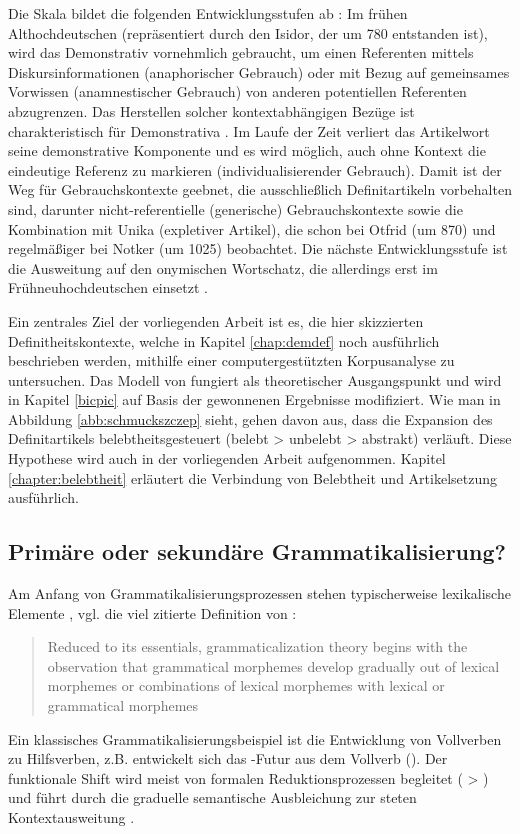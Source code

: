  
Die Skala bildet die folgenden Entwicklungsstufen ab \parencite[vgl. auch][69-78]{Szczepaniak2011a}: Im frühen Althochdeutschen (repräsentiert durch den Isidor, der um 780 entstanden ist), wird das Demonstrativ vornehmlich gebraucht, um einen Referenten mittels Diskursinformationen (anaphorischer Gebrauch) oder mit Bezug auf gemeinsames Vorwissen (anamnestischer Gebrauch) von anderen potentiellen Referenten abzugrenzen. Das Herstellen solcher kontextabhängigen Bezüge ist charakteristisch für Demonstrativa \parencite{Himmelmann1997}. Im Laufe der Zeit verliert das Artikelwort  seine demonstrative Komponente und es wird möglich, auch ohne Kontext die eindeutige Referenz zu markieren (individualisierender Gebrauch). Damit ist der Weg für Gebrauchskontexte geebnet, die ausschließlich Definitartikeln vorbehalten sind, darunter nicht-referentielle (generische) Gebrauchskontexte sowie die Kombination mit Unika (expletiver Artikel), die \parencite{Oubouzar1989,Oubouzar1992} schon bei Otfrid (um 870) und regelmäßiger bei Notker (um 1025) beobachtet. Die nächste Entwicklungsstufe ist die Ausweitung auf den onymischen Wortschatz, die allerdings erst im Frühneuhochdeutschen einsetzt \parencite{Schmuck2014}. 

Ein zentrales Ziel der vorliegenden Arbeit ist es, die hier skizzierten Definitheitskontexte, welche in Kapitel \ref{chap:demdef} noch ausführlich beschrieben werden, mithilfe einer computergestützten Korpusanalyse zu untersuchen. Das Modell von \textcite{Schmuck2014} fungiert als theoretischer Ausgangspunkt und wird in Kapitel \ref{bicpic} auf Basis der gewonnenen Ergebnisse modifiziert. Wie man in Abbildung \ref{abb:schmuckszczep} sieht, gehen \textcite{Schmuck2014} davon aus, dass die Expansion des Definitartikels belebtheitsgesteuert (belebt > unbelebt > abstrakt) verläuft. Diese Hypothese wird auch in der vorliegenden Arbeit aufgenommen. Kapitel \ref{chapter:belebtheit} erläutert die Verbindung von Belebtheit und Artikelsetzung ausführlich. 

 
\subsection{Primäre oder sekundäre Grammatikalisierung?} \label{sec:dem-quelle}

Am Anfang von Grammatikalisierungsprozessen stehen typischerweise lexikalische Elemente \parencite[vgl.][]{Heine1991,Hopper1991,Traugott1991,Bybee1994,Lehmann2015}, vgl. die viel zitierte Definition von \textcite{Bybee1994}: \blockcquote[4]{Bybee1994}{Reduced to its essentials, grammaticalization theory begins with the observation that grammatical morphemes develop gradually out of lexical morphemes or combinations of lexical morphemes with lexical or grammatical morphemes}. 
Ein klassisches Grammatikalisierungsbeispiel ist die Entwicklung von Vollverben zu Hilfsverben, z.B. entwickelt sich das -Futur aus dem Vollverb  (\cite[s.][70f.]{Heine1991}). Der funktionale Shift wird meist von formalen Reduktionsprozessen begleitet ( > ) und führt durch die graduelle semantische Ausbleichung \parencite{Heine2003} zur steten Kontextausweitung \parencite{Himmelmann2004}.  

